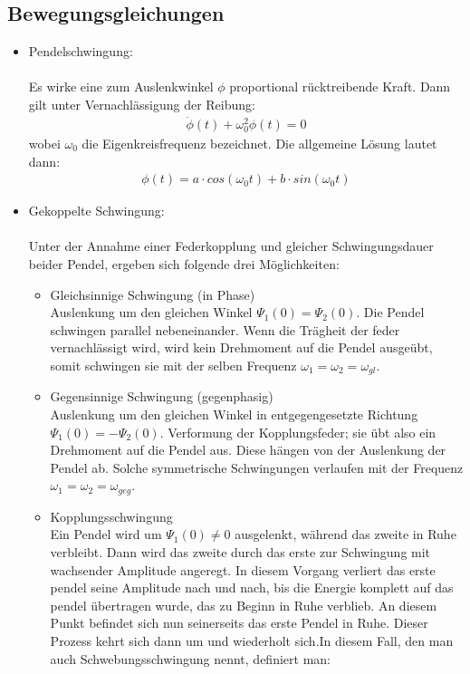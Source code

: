 \documentclass[a4paper,10pt]{scrartcl}
\begin{document}
		\subsection{Bewegungsgleichungen}
			\begin{itemize}
				\item Pendelschwingung:\\
				\\
				Es wirke eine zum Auslenkwinkel \(\phi\) proportional rücktreibende Kraft. Dann gilt unter Vernachlässigung der Reibung:
				\begin{align}
				\ddot{\phi}(t)+\omega_{0}^{2}\phi(t)=0
				\end{align}
				wobei \(\omega_{0}\) die Eigenkreisfrequenz bezeichnet. Die allgemeine Lösung lautet dann:
				\begin{align}
				\phi(t)=a\cdot cos(\omega_{0}t)+b\cdot sin(\omega_{0}t)
				\end{align}
				\item Gekoppelte Schwingung:\\
				\\
				Unter der Annahme einer Federkopplung und gleicher Schwingungsdauer beider Pendel, ergeben sich folgende drei Möglichkeiten:
				\begin{itemize}
					\item Gleichsinnige Schwingung (in Phase)\\
					Auslenkung um den gleichen Winkel \(\Psi_{1}(0)=\Psi_{2}(0)\). Die Pendel schwingen parallel nebeneinander. Wenn die Trägheit der feder vernachlässigt wird, wird kein Drehmoment auf die Pendel ausgeübt, somit schwingen sie mit der selben Frequenz \(\omega_{1}=\omega_{2}=\omega_{gl}\).
					\item Gegensinnige Schwingung (gegenphasig)\\
					Auslenkung um den gleichen Winkel in entgegengesetzte Richtung \(\Psi_{1}(0)=-\Psi_{2}(0)\). Verformung der Kopplungsfeder; sie übt also ein Drehmoment auf die Pendel aus. Diese hängen von der Auslenkung der Pendel ab. Solche symmetrische Schwingungen verlaufen mit der Frequenz \(\omega_{1}=\omega_{2}=\omega_{geg}\).
					\item Kopplungsschwingung\\
					Ein Pendel wird um \(\Psi_{1}(0)\neq 0\) ausgelenkt, während das zweite in Ruhe verbleibt. Dann wird das zweite durch das erste zur Schwingung mit wachsender Amplitude angeregt. In diesem Vorgang verliert das erste pendel seine Amplitude nach und nach, bis die Energie komplett auf das pendel übertragen wurde, das zu Beginn in Ruhe verblieb. An diesem Punkt befindet sich nun seinerseits das erste Pendel in Ruhe. Dieser Prozess kehrt sich dann um und wiederholt sich.In diesem Fall, den man auch Schwebungsschwingung nennt, definiert man:

\end{itemize}
\end{itemize}
\end{document}
